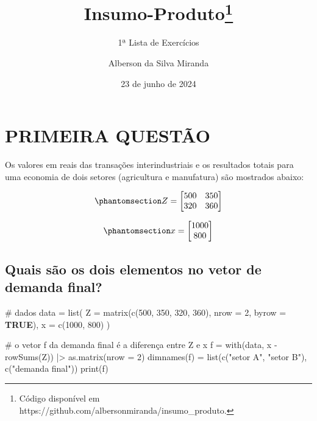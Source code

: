 \documentclass[
  letterpaper,
  DIV=11,
  numbers=noendperiod]{scrreprt}
\title{Insumo-Produto\thanks{Código disponível em
https://github.com/albersonmiranda/insumo\_produto.}}
\subtitle{1ª Lista de Exercícios}
\author{Alberson da Silva Miranda}
\date{23 de junho de 2024}
\newenvironment{Shaded}{\begin{snugshade}}{\end{snugshade}}
\newcommand{\AttributeTok}[1]{\textcolor[rgb]{0.80,0.80,0.80}{#1}}
\newcommand{\CommentTok}[1]{\textcolor[rgb]{0.50,0.62,0.50}{#1}}
\newcommand{\ConstantTok}[1]{\textcolor[rgb]{0.86,0.64,0.64}{\textbf{#1}}}
\newcommand{\DecValTok}[1]{\textcolor[rgb]{0.86,0.86,0.80}{#1}}
\newcommand{\FunctionTok}[1]{\textcolor[rgb]{0.94,0.94,0.56}{#1}}
\newcommand{\NormalTok}[1]{\textcolor[rgb]{0.80,0.80,0.80}{#1}}
\newcommand{\OtherTok}[1]{\textcolor[rgb]{0.94,0.94,0.56}{#1}}
\newcommand{\SpecialCharTok}[1]{\textcolor[rgb]{0.86,0.64,0.64}{#1}}
\newcommand{\StringTok}[1]{\textcolor[rgb]{0.80,0.58,0.58}{#1}}
\renewcommand*\contentsname{Índice}
\newcommand\contentsname{Índice}
\begin{document}
\maketitle

\renewcommand*\contentsname{Índice}
{
\hypersetup{linkcolor=}
\setcounter{tocdepth}{2}
\tableofcontents
}
\chapter{PRIMEIRA QUESTÃO}\label{primeira-questuxe3o}

Os valores em reais das transações interindustriais e os resultados
totais para uma economia de dois setores (agricultura e manufatura) são
mostrados abaixo:

\begin{equation}\phantomsection\label{eq-q1_z}{
Z =
\begin{bmatrix}
  500 & 350 \\
  320 & 360
\end{bmatrix}
}\end{equation}

\begin{equation}\phantomsection\label{eq-q1_x}{
x =
\begin{bmatrix}
  1000 \\
  800
\end{bmatrix}
}\end{equation}

\section{Quais são os dois elementos no vetor de demanda
final?}\label{quais-suxe3o-os-dois-elementos-no-vetor-de-demanda-final}

\begin{Shaded}
\begin{Highlighting}[numbers=left,,]
\CommentTok{\# dados}
\NormalTok{data }\OtherTok{=} \FunctionTok{list}\NormalTok{(}
  \AttributeTok{Z =} \FunctionTok{matrix}\NormalTok{(}\FunctionTok{c}\NormalTok{(}\DecValTok{500}\NormalTok{, }\DecValTok{350}\NormalTok{, }\DecValTok{320}\NormalTok{, }\DecValTok{360}\NormalTok{), }\AttributeTok{nrow =} \DecValTok{2}\NormalTok{, }\AttributeTok{byrow =} \ConstantTok{TRUE}\NormalTok{),}
  \AttributeTok{x =} \FunctionTok{c}\NormalTok{(}\DecValTok{1000}\NormalTok{, }\DecValTok{800}\NormalTok{)}
\NormalTok{)}

\CommentTok{\# o vetor f da demanda final é a diferença entre Z e x}
\NormalTok{f }\OtherTok{=} \FunctionTok{with}\NormalTok{(data, x }\SpecialCharTok{{-}} \FunctionTok{rowSums}\NormalTok{(Z)) }\SpecialCharTok{|\textgreater{}}
  \FunctionTok{as.matrix}\NormalTok{(}\AttributeTok{nrow =} \DecValTok{2}\NormalTok{)}
\FunctionTok{dimnames}\NormalTok{(f) }\OtherTok{=} \FunctionTok{list}\NormalTok{(}\FunctionTok{c}\NormalTok{(}\StringTok{"setor A"}\NormalTok{, }\StringTok{"setor B"}\NormalTok{), }\FunctionTok{c}\NormalTok{(}\StringTok{"demanda final"}\NormalTok{))}
\FunctionTok{print}\NormalTok{(f)}
\end{Highlighting}
\end{Shaded}
\end{document}
